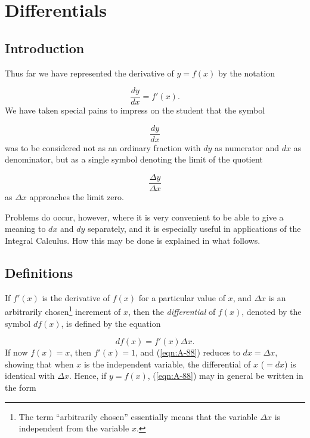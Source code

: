 
\chapter{Differentials}



\section{Introduction}

Thus far we have represented the derivative of $y = f(x)$ by the notation

\[
    \frac{dy}{dx} = f'(x).
\]
We have taken special pains to impress on the student that the symbol

\[
    \frac{dy}{dx}
\]
was to be considered not as an ordinary fraction with $dy$ 
as numerator and $dx$ as denominator, but as a single symbol 
denoting the limit of the quotient

\[
    \frac{\Delta y}{\Delta x}
\]
as $\Delta x$ approaches the limit zero.

Problems do occur, however, where it is very convenient to 
be able to give a meaning to $dx$ and $dy$ separately, and it 
is especially useful in applications of the Integral Calculus. 
How this may be done is explained in what follows.

\section{Definitions}
\label{sec:88}

If $f'(x)$ is the derivative of $f(x)$ for a particular value 
of $x$, and $\Delta x$ is an arbitrarily chosen\footnote{The term
``arbitrarily chosen'' essentially means that
the variable $\Delta x$ is independent from the variable
$x$.} %
increment of $x$, then the {\it differential} of $f(x)$, denoted 
by the symbol $df(x)$, is defined by the equation

\begin{equation}
df(x) = f'(x)\Delta x.
\label{eqn:A-88}
\end{equation}
If now $f(x) = x$, then $f'(x) = 1$, and (\ref{eqn:A-88}) reduces to
$   dx = \Delta x$,
showing that when $x$ is the independent variable, 
the differential of $x$ ($= dx$) is identical 
with $\Delta x$. Hence, if $y = f(x)$, (\ref{eqn:A-88}) may in 
general be written in the form

